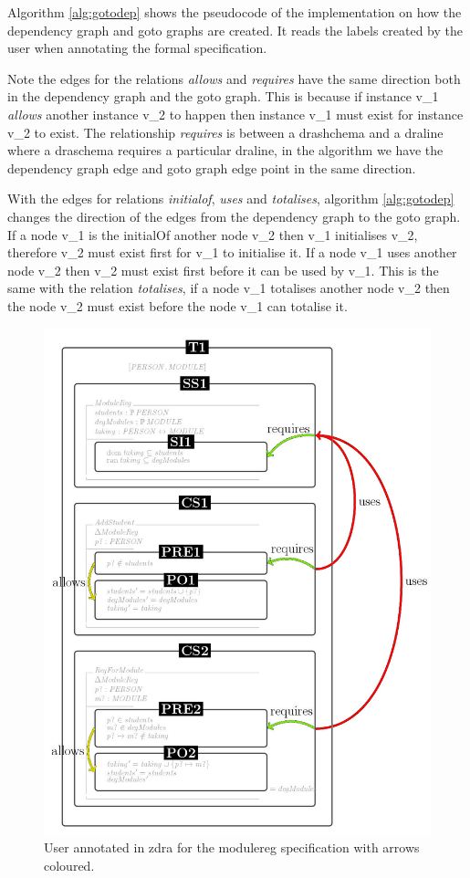 Algorithm \ref{alg:gotodep} shows the pseudocode of the implementation on how the dependency graph and goto graphs are created. It reads the labels created by the user when annotating the formal specification. 

Note the edges for the relations \emph{allows} and \emph{requires} have the same direction both in the dependency graph and the goto graph. This is because if instance v\_1 \emph{allows} another instance v\_2 to happen then instance v\_1 must exist for instance v\_2 to exist. The relationship \emph{requires} is between a drashchema and a draline where a draschema requires a particular draline, in the algorithm we have the dependency graph edge and goto graph edge point in the same direction.

With the edges for relations \emph{initialof}, \emph{uses} and \emph{totalises}, algorithm \ref{alg:gotodep} changes the direction of the edges from the dependency graph to the goto graph. If a node v\_1 is the initialOf another node v\_2 then v\_1 initialises v\_2, therefore v\_2 must exist first for v\_1 to initialise it. If a node v\_1 uses another node v\_2 then v\_2 must exist first before it can be used by v\_1. This is the same with the relation \emph{totalises}, if a node v\_1 totalises another node v\_2 then the node v\_2 must exist before the node v\_1 can totalise it.

\begin{figure}[H]
\centering
\includegraphics[scale=0.7]{Figures/Formalising/dramodule.png}
\caption{User annotated in \gls{zdra} for the modulereg specification with arrows coloured. \label{fig:zdramodule}}
\end{figure}

